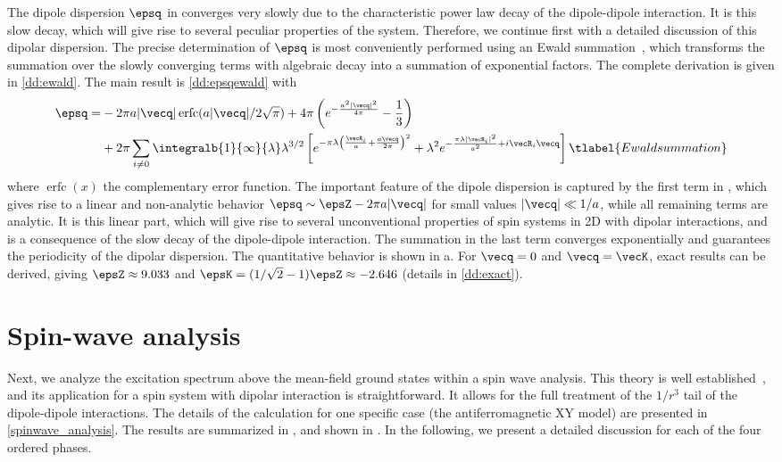 The dipole dispersion $\epsq$ in 
converges very slowly due to the characteristic power law decay of the dipole-dipole
interaction. It is this slow decay, which will give rise to several peculiar
properties of the system. Therefore, we continue first with a detailed discussion
of this dipolar dispersion. The precise determination of $\epsq$ is
most conveniently performed using an Ewald summation~\cite{Bonsall1977,Muller2010}, which transforms
the summation over the slowly converging terms with algebraic decay into a summation of exponential factors.
The complete derivation is given in \cref{dd:ewald}. The main result is \cref{dd:epsqewald} with
%
\begin{align}
    \epsq   = &- 2 \pi a | {\vecq}|\operatorname{erfc}(a |{\vecq}|/2\sqrt{\pi})   + 4 \pi \left( e^{- \frac{a^2 |{\vecq}|^2}{4 \pi}} - \frac{1}{3}\right)
\\
   & +     2 \pi \sum_{i\neq 0} \integralb{1}{\infty}{\lambda} \lambda^{3/2} \left[ e^{- \pi  \lambda \left(\frac{ {\vecR}_{i}}{a} + \frac{a {\vecq}}{2 \pi}\right)^2} +\lambda^{2}  e^{- \frac{\pi \lambda |{\vecR}_{i}|^2}{a^2}+ i {\vecR}_{i}{\vecq}}\right]\tlabel{Ewaldsummation}
\end{align}
%
where $\operatorname{erfc}(x)$ the complementary error function. The important feature of the dipole
dispersion is captured by the first term in , which
gives rise to a linear and non-analytic behavior $\epsq \sim
\epsZ - 2 \pi a |\vecq|$ for small values $|\vecq| \ll 1/a $, while all
remaining terms are analytic. It is this linear part, which will give rise to
several unconventional properties of spin systems in 2D with dipolar
interactions, and is a consequence of the slow decay of the dipole-dipole
interaction. The summation in the last term converges exponentially and
guarantees the periodicity of the dipolar dispersion. The quantitative behavior
is shown in a. For $\vecq=0$ and $\vecq=\vecK$, exact results can be derived,
giving $\epsZ\approx 9.033$ and $\epsK=(1/\sqrt{2}-1) \epsZ \approx -2.646$ (details in \cref{dd:exact}).


\section{Spin-wave analysis}

Next, we analyze the excitation spectrum above the mean-field ground states
within a spin wave analysis. This theory is well
established~\cite{Kubo1952,Auerbach1994}, and its application for a spin system with dipolar
interaction is straightforward.
It allows for the full treatment of the $1/r^3$ tail of the dipole-dipole interactions.
The details of the calculation for one specific case (the
antiferromagnetic XY model) are presented in \cref{spinwave_analysis}. The results are
summarized in , and shown in . In the following, we present a detailed
discussion for each of the four ordered phases.

